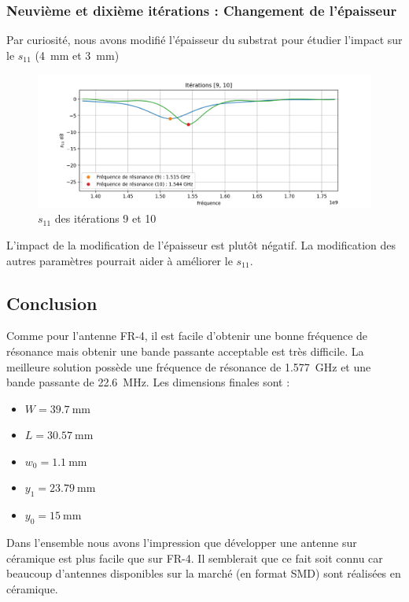 \documentclass[Deriaz_Traiber_Labo02.tex]{subfiles}
\begin{document}
\subsubsection{Neuvième et dixième itérations : Changement de l'épaisseur}
Par curiosité, nous avons modifié l'épaisseur du substrat pour étudier l'impact sur le $s_{11}$ (\SI{4}{\milli\meter} et \SI{3}{\milli\meter})
\begin{figure}[H]
\centering
\includegraphics[width=15cm]{../Calculs/run_id_ceramique_910.png}
\caption[caption]{$s_{11}$ des itérations 9 et 10}
\end{figure}
L'impact de la modification de l'épaisseur est plutôt négatif. La modification des autres paramètres pourrait aider à améliorer le $s_{11}$.
\pagebreak
\subsection{Conclusion}
Comme pour l'antenne FR-4, il est facile d'obtenir une bonne fréquence de résonance mais obtenir une bande passante acceptable est très difficile. La meilleure solution possède une fréquence de résonance de \SI{1.577}{\giga\hertz} et une bande passante de \SI{22.6}{\mega\hertz}. Les dimensions finales sont :
\begin{itemize}
\item $W=\SI{39.7}{\milli\meter}$
\item $L=\SI{30.57}{\milli\meter}$
\item $w_0=\SI{1.1}{\milli\meter}$
\item $y_1=\SI{23.79}{\milli\meter}$
\item $y_0=\SI{15}{\milli\meter}$
\end{itemize}
Dans l'ensemble nous avons l'impression que développer une antenne sur céramique est plus facile que sur FR-4. Il semblerait que ce fait soit connu car beaucoup d'antennes disponibles sur la marché (en format SMD) sont réalisées en céramique.
\end{document}
